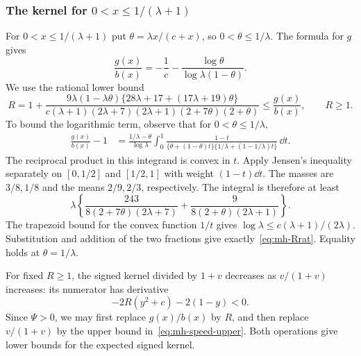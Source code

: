 \subsubsection{The kernel for \texorpdfstring{$0<x\le1/(\lambda+1)$}{0 < x <= 1/(lambda+1)}}
For $0<x\le1/(\lambda+1)$ put $\theta=\lambda x/(c+x)$, so $0<\theta\le1/\lambda$. The formula for $g$ gives
\[
 \frac{g(x)}{b(x)}=-\frac1c-\frac{\log\theta}{\log\lambda(1-\theta)}.
\]
We use the rational lower bound
\begin{equation}\label{eq:mh-Rrat}
 R=1+\frac{9\lambda(1-\lambda\theta)
                  \{28\lambda+17+(17\lambda+19)\theta\}}
 {c(\lambda+1)(2\lambda+7)(2\lambda+1)(2+7\theta)(2+\theta)}
 \le\frac{g(x)}{b(x)},\qquad R\ge1.
\end{equation}
To bound the logarithmic term, observe that for $0<\theta\le1/\lambda$,
\begin{align*}
 \frac{g(x)}{b(x)}-1
 &=\frac{1/\lambda-\theta}{\log\lambda}
   \int_0^1\frac{1-t}
   {\{\theta+(1-\theta)t\}\{1/\lambda+(1-1/\lambda)t\}}\,\dd t.
\end{align*}
The reciprocal product in this integrand is convex in $t$. Apply Jensen's inequality separately on $[0,1/2]$ and $[1/2,1]$ with weight $(1-t)\dd t$. The masses are $3/8,1/8$ and the means $2/9,2/3$, respectively. The integral is therefore at least
\[
 \lambda\left\{
 \frac{243}{8(2+7\theta)(2\lambda+7)}
 +\frac9{8(2+\theta)(2\lambda+1)}\right\}.
\]
The trapezoid bound for the convex function $1/t$ gives
$\log\lambda\le c(\lambda+1)/(2\lambda)$. Substitution and addition of the two fractions give exactly~\eqref{eq:mh-Rrat}. Equality holds at $\theta=1/\lambda$.

For fixed $R\ge1$, the signed kernel divided by $1+v$ decreases as $v/(1+v)$ increases: its numerator has derivative
\[
 -2R(y^2+c)-2(1-y)<0.
\]
Since $\Psi>0$, we may first replace $g(x)/b(x)$ by $R$, and then replace $v/(1+v)$ by the upper bound in~\eqref{eq:mh-speed-upper}. Both operations give lower bounds for the expected signed kernel.

